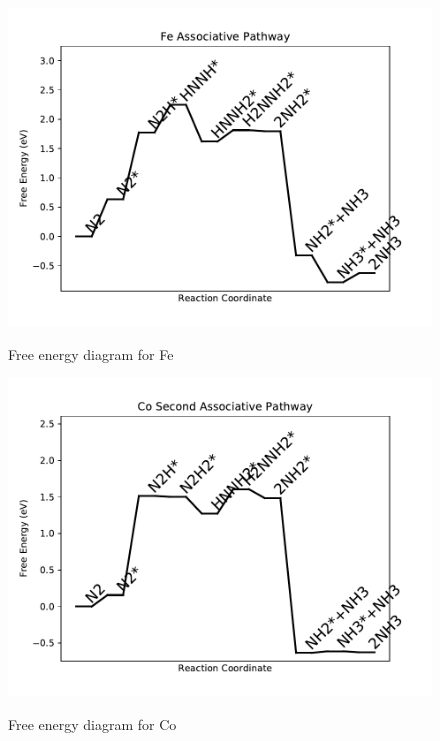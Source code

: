\documentclass{article}
\begin{document}
\begin{figure}
\includegraphics[width=1\linewidth]{data/plots/Fe_associative.pdf}
\label{fig:Fe_associative}
\caption{Free energy diagram for Fe}
\end{figure}

\begin{figure}
\includegraphics[width=1\linewidth]{data/plots/Co_associative_2.pdf}
\label{fig:Co_associative_2}
\caption{Free energy diagram for Co}
\end{figure}
\end{document}
